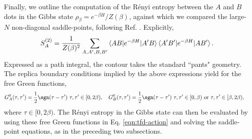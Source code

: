 \documentclass[reprint, floatfix,eqsecnum,superscriptaddress,preprint,nofootinbib,onecolumn,amsmath,amssymb,aps,prb]{revtex4-2}
\begin{document}
Finally, we outline the computation of the R\'enyi entropy between the $A$ and $B$ dots in the Gibbs state $\rho_\beta = e^{-\beta H} / Z(\beta)$, against which we compared the large-$N$  non-diagonal saddle-points, following Ref. \cite{Zhang2020a}. Explicitly,
\begin{align}
    S_A^{(2)} = \frac{1}{Z(\beta)^{2}} \sum_{A,A',B,B'} \braket{AB|e^{-\beta H}|A'B} \braket{A'B'|e^{-\beta H}|AB'}.
\end{align}
Expressed as a path integral, the contour takes the standard ``pants" geometry. The replica boundary conditions implied by the above expressions yield for the free Green functions,
\begin{align}
    G^0_A(\tau,\tau') &= \frac{1}{2}\sgn(\tau-\tau') \,\, \tau,\tau' \in [0,2\beta), \quad     \notag G^0_B(\tau,\tau') = \frac{1}{2}\sgn(\tau-\tau') \,\, \tau,\tau' \in [0,\beta)\text{ or } \tau,\tau' \in [\beta,2\beta), 
\end{align}
where $\tau \in [0,2\beta)$. The R\'enyi entropy in the Gibbs state can then be evaluated by using these free Green functions in Eq. \eqref{eqn:tfd-action} and solving the saddle-point equations, as in the preceding two subsections.



\end{document}
